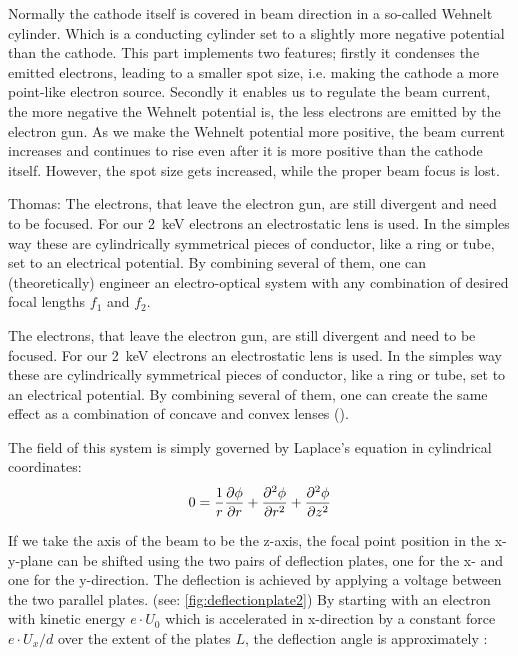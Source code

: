 Normally the cathode itself is covered in beam direction in a so-called Wehnelt cylinder. Which is a conducting cylinder set to a slightly more negative potential than the cathode. This part implements two features; firstly it condenses the emitted electrons, leading to a smaller spot size, i.e. making the cathode a more point-like electron source. Secondly it enables us to regulate the beam current, the more negative the Wehnelt potential is, the less electrons are emitted by the electron gun. As we make the Wehnelt potential more positive, the beam current increases and continues to rise even after it is more positive than the cathode itself. However, the spot size gets increased, while the proper beam focus is lost. 

Thomas: The electrons, that leave the electron gun, are still divergent and need to be focused. For our \SI{2}{\kilo\electronvolt} electrons an electrostatic lens is used.  In the simples way these are cylindrically symmetrical pieces of conductor, like a ring or tube, set to an electrical potential. By combining several of them, one can (theoretically) engineer an electro-optical system with any combination of desired focal lengths $f_1$ and $f_2$. 

The electrons, that leave the electron gun, are still divergent and need to be focused. For our \SI{2}{\kilo\electronvolt} electrons an electrostatic lens is used.  In the simples way these are cylindrically symmetrical pieces of conductor, like a ring or tube, set to an electrical potential. By combining several of them, one can create the same effect as a combination of concave and convex lenses (\cite{Demtroeder3}). 

The field of this system is simply governed by Laplace's equation in 
cylindrical coordinates:
\begin{equation}
	0=\dfrac{1}{r}\pdv{\phi}{r}+\pdv[2]{\phi}{r}+\pdv[2]{\phi}{z}
\end{equation}

If we take the axis of the beam to be the z-axis, the focal point position in the x-y-plane can be shifted using the two pairs of deflection plates, one for the x- and one for the y-direction. The deflection is achieved by applying a voltage between the two parallel plates. (see: \cref{fig:deflectionplate2}) By starting with an electron with kinetic energy $e \cdot U_0$ which is accelerated in x-direction by a constant force $e\cdot U_x / d$ over the extent of the plates $L$, the deflection angle is approximately \cite{Demtroeder3}:

